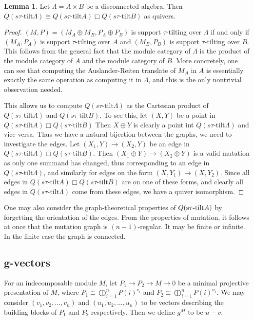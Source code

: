 \documentclass[]{article}
\theoremstyle{definition}
\newtheorem{lemma}{Lemma}[section]
\newcommand{\tu}{\ensuremath{\tau}}
\begin{document}
\begin{lemma}
	Let $\Lambda = A \times B$ be a disconnected algebra. Then $Q(s\tu\text{-tilt} \Lambda) \cong Q(s\tu\text{-tilt} A)\mathbin{\Box}Q(s\tu\text{-tilt} B)$ as quivers.
	\end{lemma}
\begin{proof}
$(M,P) = (M_A \oplus M_B,P_A \oplus P_B)$ is support \tu-tilting over $\Lambda$ if and only if $(M_A,P_A)$ is support \tu-tilting over $A$ and $(M_B,P_B)$ is support \tu-tilting over $B$. This follows from the general fact that the module category of $\Lambda$ is the product of the module category of $A$ and the module category of $B$. More concretely, one can see that computing the Auslander-Reiten translate of $M_A$ in $A$ is essentially exactly the same operation as computing it in $\Lambda$, and this is the only nontrivial observation needed.
	
This allows us to compute $Q(s\tu\text{-tilt} \Lambda)$ as the Cartesian product of $Q(s\tu\text{-tilt} A)$ and $Q(s\tu\text{-tilt} B)$. To see this, let $(X,Y)$ be a point in $Q(s\tu\text{-tilt} A) \mathbin{\Box} Q(s\tu\text{-tilt} B)$ Then $X \oplus Y$ is clearly a point int $Q(s\tu\text{-tilt} \Lambda) $ and vice versa. Thus we have a natural bijection between the graphs, we need to investigate the edges. Let $(X_1,Y) \to (X_2,Y)$ be an edge in $Q(s\tu\text{-tilt} A) \mathbin{\Box} Q(s\tu\text{-tilt} B)$.  Then $(X_1 \oplus Y) \to (X_2 \oplus Y)$ is a valid mutation as only one summand has changed, thus corresponding to an edge in $Q(s\tu\text{-tilt} \Lambda)$, and similarly for edges on the form $(X,Y_1) \to (X,Y_2)$. Since all edges in $Q(s\tu\text{-tilt} A)\mathbin{\Box}Q(s\tu\text{-tilt} B)$ are on one of these forms, and clearly all edges in $Q(s\tu\text{-tilt} \Lambda)$ come from these edges, we have a quiver isomorphism.
 	
\end{proof}

One may also consider the graph-theoretical properties of $Q(\text{s\tu-tilt} A)$ by forgetting the orientation of the edges. From the properties of mutation, it follows at once that the mutation graph is $(n-1)$-regular. It may be finite or infinite. In the finite case the graph is connected\cite[Corollary 3.10]{tau}.

\subsection{g-vectors}
For an indecomposable module $M$, let $P_1 \to P_2 \to M \to 0$ be a minimal projective presentation of $M$, where $P_1 \cong \bigoplus_{i = 1}^n P(i)^{v_i}$ and $P_2 \cong \bigoplus_{i = 1}^n P(i)^{u_i}$. We may consider $(v_1,v_2,\dots,v_n)$ and $(u_1,u_2,\dots,u_n)$ to be vectors describing the building blocks of $P_1$ and $P_2$ respectively. Then we define $g^M$ to be $u - v$. 
\end{document}
